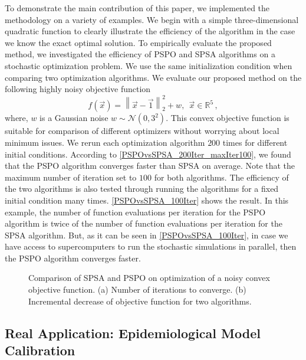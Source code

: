 To demonstrate the main contribution of this paper, we implemented the methodology on a variety of examples. We begin with a simple three-dimensional quadratic function to clearly illustrate the efficiency of the algorithm in the case we know the exact optimal solution. To empirically evaluate the proposed method, we investigated the efficiency of PSPO and SPSA algorithms on a stochastic optimization problem. We use the same initialization condition when comparing two optimization algorithms. We evaluate our proposed method on the following highly noisy objective function
$$ f(\vec{x}) = \left\|\vec{x}-\vec{1}\right\|_2^2+ w, \ \ \vec{x} \in \mathbb{R}^5\,,$$
where, $w$ is a Gaussian noise $w \sim \mathcal{N}(0,3^2)$. This convex objective function is suitable for comparison of different optimizers without worrying about local minimum issues. We rerun each optimization algorithm $200$ times for different initial conditions. According to \cref{PSPOvsSPSA_200Iter_maxIter100}, we found that the PSPO algorithm converges faster than SPSA on average. Note that the maximum number of iteration set to $100$ for both algorithms. The efficiency of the two algorithms is also tested through running the algorithms for a fixed initial condition many times. \cref{PSPOvsSPSA_100Iter} shows the result. In this example, the number of function evaluations per iteration for the PSPO algorithm is twice of the number of function evaluations per iteration for the SPSA algorithm. But, as it can be seen in \cref{PSPOvsSPSA_100Iter}, in case we have access to supercomputers to run the stochastic simulations in parallel, then the PSPO algorithm converges faster.
\begin{figure}[!h]
  \centering
	\hfill  
{}
\caption{Comparison of SPSA and PSPO on optimization of a noisy convex objective function. (a) Number of iterations to converge. (b) Incremental decrease of objective function for two algorithms.}
\label{fig:test}
\end{figure}


\subsection{Real Application: Epidemiological Model Calibration}

